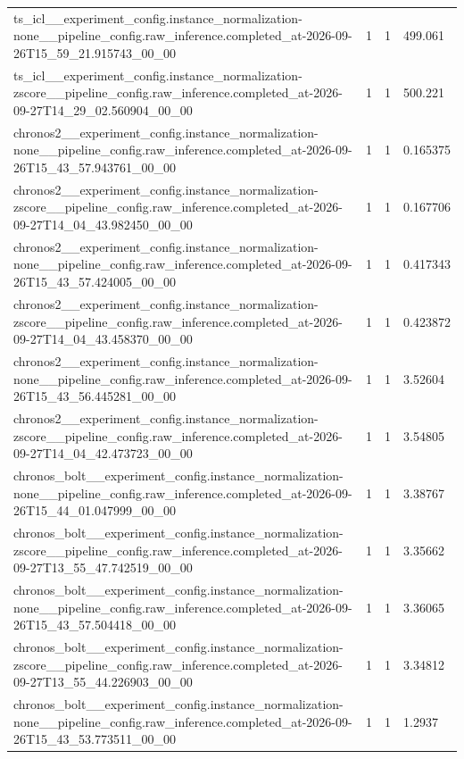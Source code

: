 \begin{tabular}{llll}
ts\_icl\_\_experiment\_config.instance\_normalization-none\_\_pipeline\_config.raw\_inference.completed\_at-2026-09-26T15\_59\_21.915743\_00\_00 & 1 & 1 & 499.061 \\
ts\_icl\_\_experiment\_config.instance\_normalization-zscore\_\_pipeline\_config.raw\_inference.completed\_at-2026-09-27T14\_29\_02.560904\_00\_00 & 1 & 1 & 500.221 \\
chronos2\_\_experiment\_config.instance\_normalization-none\_\_pipeline\_config.raw\_inference.completed\_at-2026-09-26T15\_43\_57.943761\_00\_00 & 1 & 1 & 0.165375 \\
chronos2\_\_experiment\_config.instance\_normalization-zscore\_\_pipeline\_config.raw\_inference.completed\_at-2026-09-27T14\_04\_43.982450\_00\_00 & 1 & 1 & 0.167706 \\
chronos2\_\_experiment\_config.instance\_normalization-none\_\_pipeline\_config.raw\_inference.completed\_at-2026-09-26T15\_43\_57.424005\_00\_00 & 1 & 1 & 0.417343 \\
chronos2\_\_experiment\_config.instance\_normalization-zscore\_\_pipeline\_config.raw\_inference.completed\_at-2026-09-27T14\_04\_43.458370\_00\_00 & 1 & 1 & 0.423872 \\
chronos2\_\_experiment\_config.instance\_normalization-none\_\_pipeline\_config.raw\_inference.completed\_at-2026-09-26T15\_43\_56.445281\_00\_00 & 1 & 1 & 3.52604 \\
chronos2\_\_experiment\_config.instance\_normalization-zscore\_\_pipeline\_config.raw\_inference.completed\_at-2026-09-27T14\_04\_42.473723\_00\_00 & 1 & 1 & 3.54805 \\
chronos\_bolt\_\_experiment\_config.instance\_normalization-none\_\_pipeline\_config.raw\_inference.completed\_at-2026-09-26T15\_44\_01.047999\_00\_00 & 1 & 1 & 3.38767 \\
chronos\_bolt\_\_experiment\_config.instance\_normalization-zscore\_\_pipeline\_config.raw\_inference.completed\_at-2026-09-27T13\_55\_47.742519\_00\_00 & 1 & 1 & 3.35662 \\
chronos\_bolt\_\_experiment\_config.instance\_normalization-none\_\_pipeline\_config.raw\_inference.completed\_at-2026-09-26T15\_43\_57.504418\_00\_00 & 1 & 1 & 3.36065 \\
chronos\_bolt\_\_experiment\_config.instance\_normalization-zscore\_\_pipeline\_config.raw\_inference.completed\_at-2026-09-27T13\_55\_44.226903\_00\_00 & 1 & 1 & 3.34812 \\
chronos\_bolt\_\_experiment\_config.instance\_normalization-none\_\_pipeline\_config.raw\_inference.completed\_at-2026-09-26T15\_43\_53.773511\_00\_00 & 1 & 1 & 1.2937 \\

\end{tabular}
